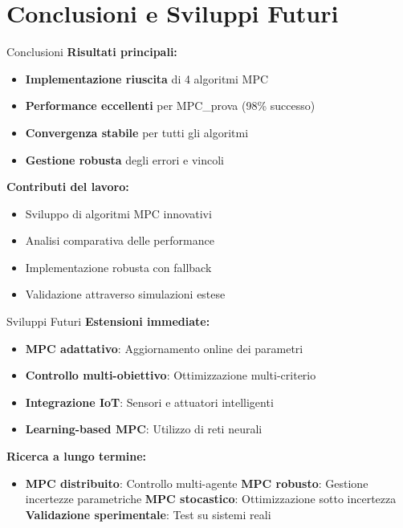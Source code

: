 \documentclass[beamer]{beamer}
\begin{document}
\section{Conclusioni e Sviluppi Futuri}

\begin{frame}{Conclusioni}
    \textbf{Risultati principali:}
    \begin{itemize}
        \item \textbf{Implementazione riuscita} di 4 algoritmi MPC
        \item \textbf{Performance eccellenti} per MPC\_prova (98\% successo)
        \item \textbf{Convergenza stabile} per tutti gli algoritmi
        \item \textbf{Gestione robusta} degli errori e vincoli
    \end{itemize}
    
    \textbf{Contributi del lavoro:}
    \begin{itemize}
        \item Sviluppo di algoritmi MPC innovativi
        \item Analisi comparativa delle performance
        \item Implementazione robusta con fallback
        \item Validazione attraverso simulazioni estese
    \end{itemize}
\end{frame}

\begin{frame}{Sviluppi Futuri}
    \textbf{Estensioni immediate:}
    \begin{itemize}
        \item \textbf{MPC adattativo}: Aggiornamento online dei parametri
        \item \textbf{Controllo multi-obiettivo}: Ottimizzazione multi-criterio
        \item \textbf{Integrazione IoT}: Sensori e attuatori intelligenti
        \item \textbf{Learning-based MPC}: Utilizzo di reti neurali
    \end{itemize}
    
    \textbf{Ricerca a lungo termine:}
    \begin{itemize}
        \item \textbf{MPC distribuito}: Controllo multi-agente
        \textbf{MPC robusto}: Gestione incertezze parametriche
        \textbf{MPC stocastico}: Ottimizzazione sotto incertezza
        \textbf{Validazione sperimentale}: Test su sistemi reali
    \end{itemize}
\end{frame}
\end{document}
